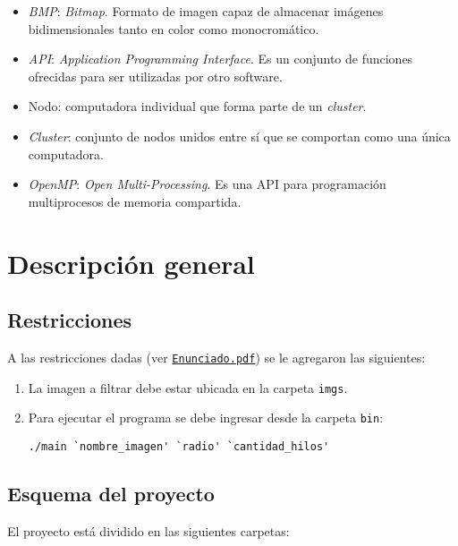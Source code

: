 \documentclass[12pt,a4paper]{article}
\begin{document}
\begin{itemize}
  \item \emph{BMP}: \emph{Bitmap}. Formato de imagen capaz de almacenar
  imágenes bidimensionales tanto en color como monocromático.\cite{bmpfor}
  \item \emph{API}: \emph{Application Programming Interface}. Es un conjunto
  de funciones ofrecidas para ser utilizadas por otro software.
  \item Nodo: computadora individual que forma parte de un \emph{cluster}.
  \item \emph{Cluster}: conjunto de nodos unidos entre sí que se comportan
  como una única computadora.
  \item \emph{OpenMP}: \emph{Open Multi-Processing}. Es una API para programación
  multiprocesos de memoria compartida.\cite{omp}
\end{itemize}


\section{Descripción general}
\label{desc}

\subsection{Restricciones}
\label{restrictions}
A las restricciones dadas (ver \href{run:../Enunciado.pdf}
{\texttt{Enunciado.pdf}}) se le agregaron las siguientes:

\begin{enumerate}[leftmargin=1.5cm]
  \item La imagen a filtrar debe estar ubicada en la carpeta \verb|imgs|.
  \item Para ejecutar el programa se debe ingresar desde la carpeta \verb|bin|:

  \begin{center}
    \verb|./main `nombre_imagen' `radio' `cantidad_hilos'|
  \end{center}
\end{enumerate}


\subsection{Esquema del proyecto}
\label{esq}

El proyecto está dividido en las siguientes carpetas:
\end{document}
